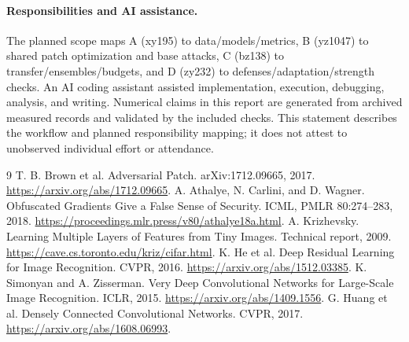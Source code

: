 \documentclass{article}
\begin{document}
\paragraph{Responsibilities and AI assistance.}
The planned scope maps A (xy195) to data/models/metrics, B (yz1047) to shared patch optimization and base attacks, C (bz138) to transfer/ensembles/budgets, and D (zy232) to defenses/adaptation/strength checks. An AI coding assistant assisted implementation, execution, debugging, analysis, and writing. Numerical claims in this report are generated from archived measured records and validated by the included checks. This statement describes the workflow and planned responsibility mapping; it does not attest to unobserved individual effort or attendance.
\clearpage
\begin{thebibliography}{9}
 T. B. Brown et al. Adversarial Patch. arXiv:1712.09665, 2017. \url{https://arxiv.org/abs/1712.09665}.
 A. Athalye, N. Carlini, and D. Wagner. Obfuscated Gradients Give a False Sense of Security. ICML, PMLR 80:274--283, 2018. \url{https://proceedings.mlr.press/v80/athalye18a.html}.
 A. Krizhevsky. Learning Multiple Layers of Features from Tiny Images. Technical report, 2009. \url{https://cave.cs.toronto.edu/kriz/cifar.html}.
 K. He et al. Deep Residual Learning for Image Recognition. CVPR, 2016. \url{https://arxiv.org/abs/1512.03385}.
 K. Simonyan and A. Zisserman. Very Deep Convolutional Networks for Large-Scale Image Recognition. ICLR, 2015. \url{https://arxiv.org/abs/1409.1556}.
 G. Huang et al. Densely Connected Convolutional Networks. CVPR, 2017. \url{https://arxiv.org/abs/1608.06993}.
\end{thebibliography}
\end{document}
